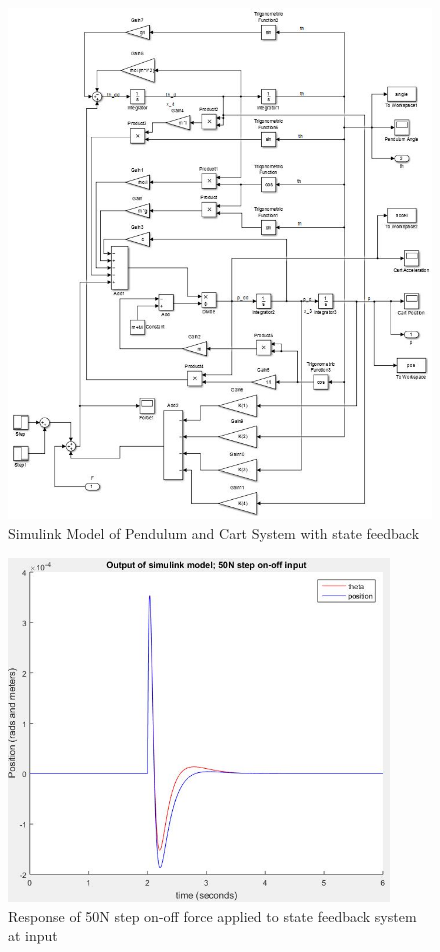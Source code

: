 \documentclass[12pt]{article}
\begin{document}
\begin{center}
\begin{figure}[htb]
	\includegraphics[width=1.1\textwidth]{PBA3_5_model.jpg}
\caption{Simulink Model of Pendulum and Cart System with state feedback}
\end{figure}
\end{center}

\clearpage

\begin{center}
\begin{figure}[htb]
	\includegraphics[width=0.9\textwidth]{PBA3_5_50N_response.jpg}
\caption{Response of 50N step on-off force applied to state feedback system at input}
\end{figure}
\end{center}
\end{document}
